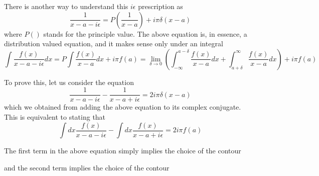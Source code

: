 \documentclass[11pt, notitlepage]{report}
\numberwithin{equation}{section}
\begin{document}
    There is another way to understand this \(i\epsilon\) prescription as 
    \begin{equation*}
        \frac{1}{x - a - i\epsilon} = P\left( \frac{1}{x-a} \right) + i\pi \delta(x-a)
    \end{equation*}
    where \(P()\) stands for the principle value. The above equation is, in essence, a distribution valued equation, and it makes sense only under an integral 
    \begin{equation*}
        \int \frac{f(x)}{x-a-i\epsilon} dx = P\int \frac{f(x)}{x-a} dx + i\pi f(a) =\lim_{\delta \to 0} \left(\int_{-\infty}^{a-\delta} \frac{f(x)}{x-a} dx+ \int_{a+\delta}^{\infty} \frac{f(x)}{x-a} dx \right) + i\pi f(a)
    \end{equation*}

    To prove this, let us consider the equation
    \begin{equation*}
        \frac{1}{x-a-i\epsilon} - \frac{1}{x-a+i\epsilon} = 2i\pi\delta(x-a)
    \end{equation*}
    which we obtained from adding the above equation to its complex conjugate.\\
    This is equivalent to stating that 
    \begin{equation*}
        \int dx \frac{f(x)}{x-a-i\epsilon} - \int dx \frac{f(x)}{x-a+i\epsilon} = 2i\pi f(a)
    \end{equation*}

    The first term in the above equation simply implies the choice of the contour 
    \begin{figure}[h]
        \centering
    \end{figure}

    and the second term implies the choice of the contour 
    \begin{figure}[h]
        \centering
    \end{figure}
\end{document}
